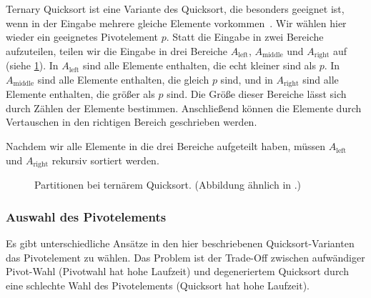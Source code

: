 \noindent
Ternary Quicksort ist eine Variante des Quicksort, die besonders geeignet ist,
wenn in der Eingabe mehrere gleiche Elemente vorkommen~\cite{ternary_quicksort}.
Wir wählen hier wieder ein geeignetes Pivotelement $p$.
Statt die Eingabe in zwei Bereiche aufzuteilen, teilen wir die Eingabe in drei Bereiche $A_{\text{left}}$, $A_{\text{middle}}$ und $A_{\text{right}}$ auf (siehe \cref{fg:ternary_partitions}).
In $A_{\text{left}}$ sind alle Elemente enthalten, die echt kleiner sind als $p$.
In $A_{\text{middle}}$ sind alle Elemente enthalten, die gleich $p$ sind, und in $A_{\text{right}}$ sind alle Elemente enthalten, die größer als $p$ sind.
Die Größe dieser Bereiche lässt sich durch Zählen der Elemente bestimmen.
Anschließend können die Elemente durch Vertauschen in den richtigen Bereich geschrieben werden.

Nachdem wir alle Elemente in die drei Bereiche aufgeteilt haben, müssen $A_{\text{left}}$ und $A_{\text{right}}$ rekursiv sortiert werden.

\begin{figure}[!h]
	\centering
	\caption[Partitionen bei ternärem Quicksort]{Partitionen bei ternärem Quicksort. (Abbildung ähnlich in \cite{ternary_quicksort}.)}
	\label{fg:ternary_partitions}
\end{figure}

\subsubsection{Auswahl des Pivotelements}

Es gibt unterschiedliche Ansätze in den hier beschriebenen Quicksort-Varianten das Pivotelement zu wählen.
Das Problem ist der Trade-Off zwischen aufwändiger Pivot-Wahl (Pivotwahl hat hohe Laufzeit) und
degeneriertem Quicksort durch eine schlechte Wahl des Pivotelements (Quicksort hat hohe Laufzeit).

